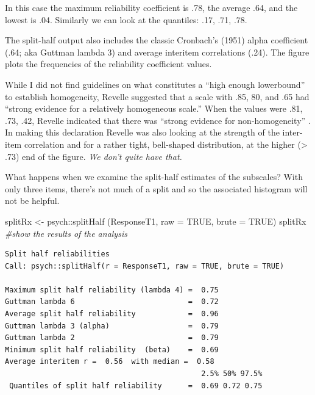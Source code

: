\documentclass[
  english,
]{book}
\newenvironment{Shaded}{\begin{snugshade}}{\end{snugshade}}
\newcommand{\AttributeTok}[1]{\textcolor[rgb]{0.77,0.63,0.00}{#1}}
\newcommand{\CommentTok}[1]{\textcolor[rgb]{0.56,0.35,0.01}{\textit{#1}}}
\newcommand{\ConstantTok}[1]{\textcolor[rgb]{0.00,0.00,0.00}{#1}}
\newcommand{\FunctionTok}[1]{\textcolor[rgb]{0.00,0.00,0.00}{#1}}
\newcommand{\NormalTok}[1]{#1}
\newcommand{\OtherTok}[1]{\textcolor[rgb]{0.56,0.35,0.01}{#1}}
\newcommand{\SpecialCharTok}[1]{\textcolor[rgb]{0.00,0.00,0.00}{#1}}
\begin{document}
In this case the maximum reliability coefficient is .78, the average .64, and the lowest is .04. Similarly we can look at the quantiles: .17, .71, .78.

The split-half output also includes the classic Cronbach's (1951) alpha coefficient (.64; aka Guttman lambda 3) and average interitem correlations (.24). The figure plots the frequencies of the reliability coefficient values.

While I did not find guidelines on what constitutes a ``high enough lowerbound'' to establish homogeneity, Revelle suggested that a scale with .85, 80, and .65 had ``strong evidence for a relatively homogeneous scale.'' When the values were .81, .73, .42, Revelle indicated that there was ``strong evidence for non-homogeneity'' \citep[p.~11]{revelle_reliability_2019}. In making this declaration Revelle was also looking at the strength of the inter-item correlation and for a rather tight, bell-shaped distribution, at the higher (\textgreater{} .73) end of the figure. \emph{We don't quite have that.}

What happens when we examine the split-half estimates of the subscales? With only three items, there's not much of a split and so the associated histogram will not be helpful.

\begin{Shaded}
\begin{Highlighting}[]
\NormalTok{splitRx }\OtherTok{\textless{}{-}}\NormalTok{ psych}\SpecialCharTok{::}\FunctionTok{splitHalf}\NormalTok{ (ResponseT1, }\AttributeTok{raw =} \ConstantTok{TRUE}\NormalTok{, }\AttributeTok{brute =} \ConstantTok{TRUE}\NormalTok{)}
\NormalTok{splitRx }\CommentTok{\#show the results of the analysis}
\end{Highlighting}
\end{Shaded}

\begin{verbatim}
Split half reliabilities  
Call: psych::splitHalf(r = ResponseT1, raw = TRUE, brute = TRUE)

Maximum split half reliability (lambda 4) =  0.75
Guttman lambda 6                          =  0.72
Average split half reliability            =  0.96
Guttman lambda 3 (alpha)                  =  0.79
Guttman lambda 2                          =  0.79
Minimum split half reliability  (beta)    =  0.69
Average interitem r =  0.56  with median =  0.58
                                             2.5% 50% 97.5%
 Quantiles of split half reliability      =  0.69 0.72 0.75
\end{verbatim}
\end{document}
